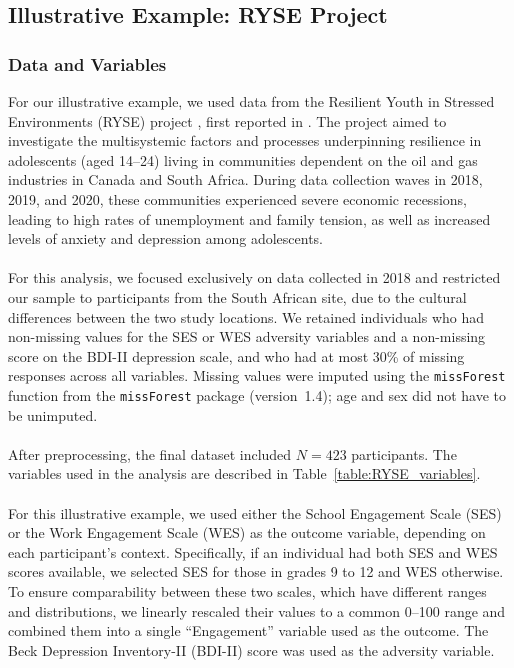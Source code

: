 \documentclass[12pt]{article}
\begin{document}
\subsection{Illustrative Example: RYSE Project}
\subsubsection{Data and Variables}
For our illustrative example, we used data from the Resilient Youth in Stressed Environments (RYSE) project \cite{site_RYSE}, first reported in \cite{first_RYSE}. The project aimed to investigate the multisystemic factors and processes underpinning resilience in adolescents (aged 14–24) living in communities dependent on the oil and gas industries in Canada and South Africa. During data collection waves in 2018, 2019, and 2020, these communities experienced severe economic recessions, leading to high rates of unemployment and family tension, as well as increased levels of anxiety and depression among adolescents.\\
\\
For this analysis, we focused exclusively on data collected in 2018 and restricted our sample to participants from the South African site, due to the cultural differences between the two study locations. We retained individuals who had non-missing values for the SES or WES adversity variables and a non-missing score on the BDI-II depression scale, and who had at most 30\% of missing responses across all variables. Missing values were imputed using the \texttt{missForest} function from the \texttt{missForest} package (version~1.4); age and sex did not have to be unimputed.\\
\\
After preprocessing, the final dataset included \(N=423 \) participants. The variables used in the analysis are described in Table~\ref{table:RYSE_variables}.\\
\\
For this illustrative example, we used either the School Engagement Scale (SES) or the Work Engagement Scale (WES) as the outcome variable, depending on each participant's context. Specifically, if an individual had both SES and WES scores available, we selected SES for those in grades 9 to 12 and WES otherwise. To ensure comparability between these two scales, which have different ranges and distributions, we linearly rescaled their values to a common 0–100 range and combined them into a single “Engagement” variable used as the outcome. The Beck Depression Inventory-II (BDI-II) score was used as the adversity variable.
\end{document}
